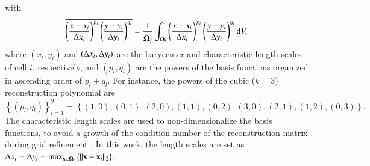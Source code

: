 with
\begin{equation}
    \overline{
        \left(\frac{x - x_{i}}{\mathrm\Delta x_i}\right)^{p_l}
        \left(\frac{y - y_{i}}{\mathrm\Delta y_i}\right)^{q_l}
    }= \dfrac{1}{\overline{\mathbf{\Omega}}_i}\int_{\mathbf{\Omega}_i}   \left(\frac{x - x_{i}}{\mathrm\Delta x_i}\right)^{p_l}
    \left(\frac{y - y_{i}}{\mathrm\Delta y_i}\right)^{q_l}  \dd V,
\end{equation}
where $\left(x_i,y_i\right)$ and $\left(\mathrm\Delta x_i, \mathrm\Delta y_i\right)$ are the barycenter and characteristic length scales of cell $i$, respectively, and $\left(p_l,q_l\right)$ are the powers of the basis functions organized in ascending order of $p_l+q_l$. For instance, the powers of the cubic ($k=3$) reconstruction polynomial are
\begin{equation}
    \left\{ \left(p_l,q_l\right) \right\}^9_{l=1}= \left\{ \left(1,0\right), \left(0,1\right), \left(2,0\right),\left(1,1\right),\left(0,2\right),\left(3,0\right),\left(2,1\right),\left(1,2\right),\left(0,3\right) \right\}.
\end{equation}
The characteristic length scales are used to non-dimensionalize the basis functions, to avoid a growth of the condition number of the reconstruction matrix during grid refinement \cite{abgrall1994essentially,friedrich1998weighted_WENO}. In this work, the length scales are set as $ \mathrm\Delta x_i = \mathrm\Delta y_i = \max_{\mathbf{x} \in \mathbf{\Omega}_i} \left\{\|\mathbf{x} - \mathbf{x}_{i}\|_2\right\}$.

